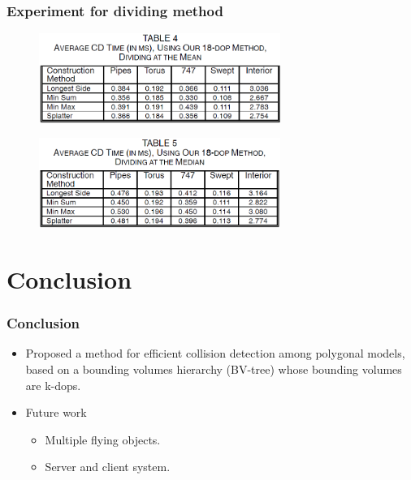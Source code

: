 \documentclass{beamer}
\begin{document}
	\begin{frame}
	\frametitle{Experiment for dividing method}
	\begin{figure}[h!]
		\centering
		\includegraphics[width=0.7\textwidth]{./figure/TABLE4.PNG}
	\end{figure}
	\begin{figure}[h!]
		\centering
		\includegraphics[width=0.7\textwidth]{./figure/TABLE5.PNG}
	\end{figure}
	\end{frame}

\section{Conclusion}

\begin{frame}
\frametitle{Conclusion}
\begin{itemize}
	\item Proposed a method for efficient collision detection among polygonal models, based on a bounding volumes hierarchy (BV-tree) whose bounding volumes are k-dops.
	\item Future work
		\begin{itemize}
		\item Multiple flying objects.
		\item Server and client system.
		\end{itemize}
\end{itemize}
\end{frame}
\end{document}
